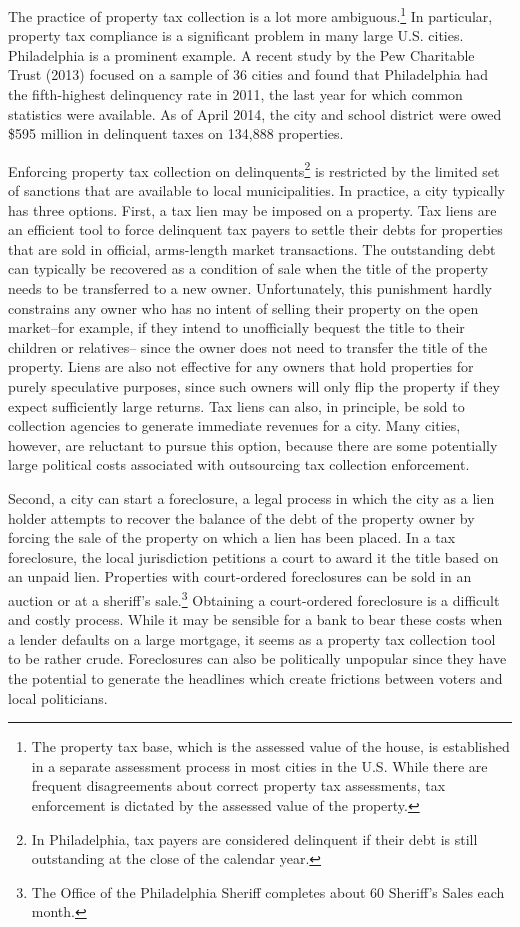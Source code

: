 \documentclass[12pt,titlepage]{article}
\begin{document}
The practice of property tax collection is a lot more
ambiguous.\footnote{The property tax base, which is the assessed value
  of the house, is established in a separate assessment process in
  most cities in the U.S. While there are frequent disagreements about
  correct property tax assessments, tax enforcement is dictated by the
  assessed value of the property.} In particular, property tax
compliance is a significant problem in many large
U.S. cities. Philadelphia is a prominent example.  A recent study by
the Pew Charitable Trust (2013) focused on a sample of 36 cities and
found that Philadelphia had the fifth-highest delinquency rate in
2011, the last year for which common statistics were available.  As of
April 2014, the city and school district were owed \$595 million in
delinquent taxes on 134,888 properties.

Enforcing property tax collection on
delinquents\footnote{In Philadelphia, tax payers are considered
delinquent if their debt is still outstanding at the close of the calendar year.}
is restricted by the limited set of sanctions
that are available to local municipalities.  In practice, a city
typically has three options. First, a tax lien may be imposed on a
property. Tax liens are an efficient tool to force delinquent tax payers to settle their
debts for properties that are sold in official, arms-length market transactions. The outstanding
debt can typically be recovered as a condition of sale when the title of the property needs
to be transferred to a new owner. Unfortunately, this punishment hardly
constrains any owner who has no intent of selling their property
on the open market--for example, if they intend to unofficially bequest
the title to their children or relatives--
since the owner does not need to transfer the title of
the property. Liens are also not effective for any owners that hold 
properties for purely speculative purposes, since such owners will only
flip the property if they expect sufficiently large returns. Tax
liens can also, in principle, be sold to collection agencies to generate
immediate revenues for a city. Many cities, however, are reluctant to
pursue this option, because there are some potentially large political costs
associated with outsourcing tax collection enforcement.

Second, a city can start a foreclosure, a legal process in
which the city as a lien holder attempts to recover the balance of the
debt of the property owner by forcing the sale of the property on
which a lien has been placed.  In a tax foreclosure, the local jurisdiction
petitions a court to award it the title based on an unpaid lien. 
Properties with court-ordered foreclosures can be
 sold in an auction or  at a sheriff's sale.\footnote{The Office of
the Philadelphia Sheriff completes about 60 Sheriff's Sales each month.}
Obtaining a court-ordered foreclosure is a difficult and costly process. While
it may be sensible for a bank to bear these costs 
when a lender defaults on a large mortgage, it
seems as a property tax collection tool to be rather crude.
Foreclosures can also be politically unpopular since they 
have the potential to generate the headlines which create
frictions between voters and local politicians.
\end{document}
